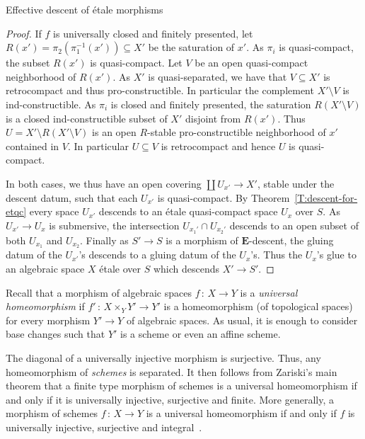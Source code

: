 \documentclass[a4paper,twoside,11pt]{amsart}[2009/07/02] %
\newcommand{\pref}[1]{\eqref{#1}}
\newcommand{\map}[3]{#1\,:\, #2\rightarrow #3}
\newcommand{\etale}{\'{e}tale}
\newcommand{\catE}{\mathbf{E}}
\begin{document}
\begin{section}{Effective descent of \etale{} morphisms}
\begin{proof}
If $f$ is universally closed and finitely presented, let
$R(x')=\pi_2(\pi_1^{-1}(x'))\subseteq X'$ be the saturation of $x'$. As $\pi_i$
is quasi-compact, the subset $R(x')$ is quasi-compact. Let $V$ be an open
quasi-compact neighborhood of $R(x')$. As $X'$ is quasi-separated,
we have that $V\subseteq X'$ is retrocompact and thus pro-constructible. In
particular the complement $X'\setminus V$ is ind-constructible. As $\pi_i$ is
closed and finitely presented, the saturation $R(X'\setminus V)$ is a closed
ind-constructible subset of $X'$ disjoint from $R(x')$. Thus
$U=X'\setminus R(X'\setminus V)$ is an open $R$-stable pro-constructible
neighborhood of $x'$ contained in $V$. In particular $U\subseteq V$ is
retrocompact and hence $U$ is quasi-compact.

In both cases, we thus have an open covering $\coprod U_{x'}\to X'$, stable
under the descent datum, such that each $U_{x'}$ is quasi-compact.
%
By Theorem~\pref{T:descent-for-etqc} every space $U_{x'}$
%
descends to an \etale{} quasi-compact space $U_x$ over $S$.
%
As $U_{x'}\to U_x$ is submersive, the intersection $U_{x_1'}\cap U_{x_2'}$
descends to an open subset of both $U_{x_1}$ and $U_{x_2}$. Finally as $S'\to
S$ is a morphism of $\catE$-descent, the gluing datum of the $U_{x'}$'s
descends to a gluing datum of the $U_{x}$'s. Thus the $U_{x}$'s glue to an
algebraic space $X$ \etale{} over $S$ which descends $X'\to S'$.
\end{proof}


Recall that a morphism of algebraic spaces $\map{f}{X}{Y}$ is a \emph{universal
homeomorphism} if $\map{f'}{X\times_Y Y'}{Y'}$ is a homeomorphism (of
topological spaces) for every morphism $Y'\to Y$ of algebraic spaces. As usual,
it is enough to consider base changes such that $Y'$ is a scheme or even
an affine scheme.

The diagonal of a universally injective morphism is surjective.
Thus,
%
any homeomorphism of \emph{schemes} is separated. It then follows
from Zariski's main theorem that a finite type morphism of schemes is a
universal homeomorphism if and only if it is universally injective, surjective
and finite. More generally, a morphism of schemes $\map{f}{X}{Y}$ is a
universal homeomorphism if and only if $f$ is universally injective, surjective
and integral~\cite[Cor.~18.12.11]{egaIV}.


\end{section}
\end{document}
